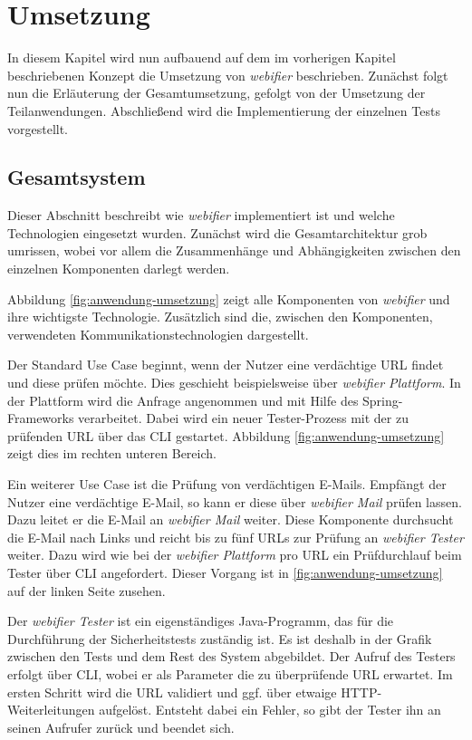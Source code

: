 \chapter{Umsetzung}

In diesem Kapitel wird nun aufbauend auf dem im vorherigen Kapitel beschriebenen Konzept die
Umsetzung von \textit{webifier} beschrieben. Zunächst folgt nun die Erläuterung der Gesamtumsetzung,
gefolgt von der Umsetzung der Teilanwendungen. Abschließend wird die Implementierung der einzelnen Tests vorgestellt.

\section{Gesamtsystem}

Dieser Abschnitt beschreibt wie \textit{webifier} implementiert ist und welche Technologien
eingesetzt wurden.
Zunächst wird die Gesamtarchitektur grob umrissen, wobei vor allem die Zusammenhänge
und Abhängigkeiten zwischen den einzelnen Komponenten darlegt werden.

Abbildung \ref{fig:anwendung-umsetzung} zeigt alle Komponenten von \textit{webifier} und ihre
wichtigste Technologie.
Zusätzlich sind die, zwischen den Komponenten, verwendeten
Kommunikationstechnologien dargestellt.

Der Standard Use Case beginnt, wenn der Nutzer eine verdächtige \acs{URL} findet und diese prüfen
möchte. Dies geschieht beispielsweise über \textit{webifier Plattform}.
In der Plattform wird die Anfrage angenommen und mit Hilfe des Spring-Frameworks verarbeitet.
Dabei wird ein neuer Tester-Prozess mit der zu prüfenden \acs{URL} über das \ac{CLI} gestartet.
Abbildung \ref{fig:anwendung-umsetzung} zeigt dies im rechten unteren Bereich.

Ein weiterer Use Case ist die Prüfung von verdächtigen E-Mails.
Empfängt der Nutzer eine verdächtige E-Mail, so kann er diese über \textit{webifier Mail} prüfen
lassen.
Dazu leitet er die E-Mail an \textit{webifier Mail} weiter.
Diese Komponente durchsucht die E-Mail nach Links und reicht bis zu fünf \acsp{URL} zur Prüfung an
\textit{webifier Tester} weiter.
Dazu wird wie bei der \textit{webifier Plattform} pro \acs{URL} ein Prüfdurchlauf beim Tester über
\ac{CLI} angefordert.
Dieser Vorgang ist in \autoref{fig:anwendung-umsetzung} auf der linken Seite zusehen.

Der \textit{webifier Tester} ist ein eigenständiges Java-Programm, das für die Durchführung der Sicherheitstests zuständig ist.
Es ist deshalb in der Grafik zwischen den Tests und dem Rest des System abgebildet.
Der Aufruf des Testers erfolgt über \ac{CLI}, wobei er als Parameter die zu überprüfende \ac{URL} erwartet.
Im ersten Schritt wird die \ac{URL} validiert und ggf. über etwaige \ac{HTTP}-Weiterleitungen aufgelöst.
Entsteht dabei ein Fehler, so gibt der Tester ihn an seinen Aufrufer zurück und beendet sich.

